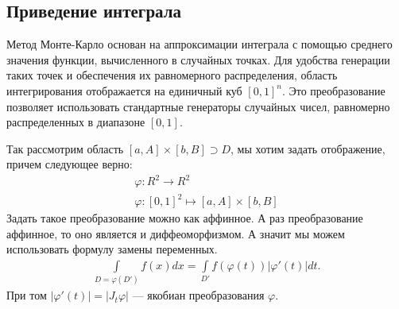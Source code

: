 \subsection{Приведение интеграла}
Метод Монте-Карло основан на аппроксимации интеграла с помощью среднего значения функции, вычисленного в случайных точках. Для удобства генерации таких точек и обеспечения их равномерного распределения, область интегрирования отображается на единичный куб \([0,1]^n\). Это преобразование позволяет использовать стандартные генераторы случайных чисел, равномерно распределенных в диапазоне \([0,1]\).

Так рассмотрим область \([a, A] \times [b, B] \supset D\), мы хотим задать отображение, причем следующее верно:
\begin{align}
	\varphi \colon R^2 \to R^2 \\
	\varphi \colon [0, 1]^2 \mapsto [a, A] \times [b, B]
\end{align}
Задать такое преобразование можно как аффинное. А раз преобразование аффинное, то оно является и диффеоморфизмом. А значит мы можем использовать формулу замены переменных.
\begin{align}
	\int\limits_{D=\varphi(D')}f(x)dx = \int\limits_{D'}f(\varphi(t))|\varphi'(t)|dt.
\end{align}
При том \(|\varphi'(t)| = |J_t\varphi|\) --- якобиан преобразования \(\varphi\).

